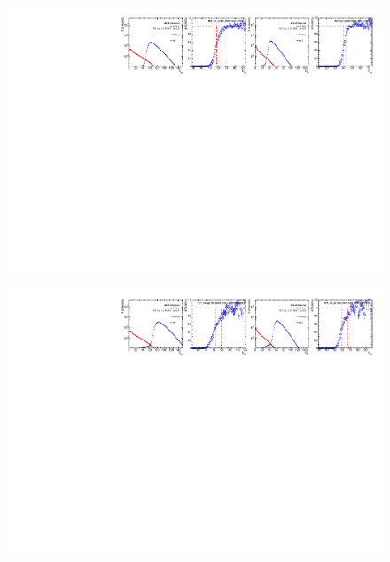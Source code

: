 \begin{figure}[H]
\centering
\includegraphics[width=1.\linewidth]{figs/sec_evtSlc/trigEff_pp13_run4/trigEff_Trig18.pdf}
\end{figure}
\begin{figure}[H]
\centering
\includegraphics[width=1.\linewidth]{figs/sec_evtSlc/trigEff_pp13_run4/trigEff_Trig24.pdf}
\end{figure}
